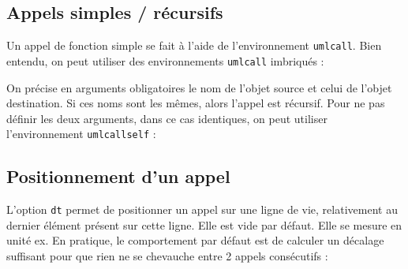 \documentclass[a4paper,11pt]{report}
\newcommand{\inputTikZ}[1]{%
  }%
\newcommand{\inputTikZ}[1]{%
    \texttt{[image: fig/\#1.pdf]}%
  }%
\begin{document}
\subsection{Appels simples / récursifs}\label{ss.call}

Un appel de fonction simple se fait à l'aide de l'environnement {\tt umlcall}. Bien entendu, on peut utiliser des environnements {\tt umlcall} imbriqués :

\medskip

\begin{minipage}{0.4\textwidth}

\end{minipage}
\begin{minipage}{0.6\textwidth}
\begin{center}
\inputTikZ{call}
\end{center}
\end{minipage}

\medskip

On précise en arguments obligatoires le nom de l'objet source et celui de l'objet destination.
Si ces noms sont les mêmes, alors l'appel est récursif. Pour ne pas définir les deux arguments, dans ce cas identiques, on peut utiliser l'environnement {\tt umlcallself} :

\medskip

\begin{minipage}{0.5\textwidth}

\end{minipage}
\begin{minipage}{0.5\textwidth}
\begin{center}
\inputTikZ{callself}
\end{center}
\end{minipage}

\subsection{Positionnement d'un appel}\label{ss.calldt}

L'option {\tt dt} permet de positionner un appel sur une ligne de vie, relativement au dernier élément présent sur cette ligne. Elle est vide par défaut. Elle se mesure en unité ex. En pratique, le comportement par défaut est de calculer un décalage suffisant pour que rien ne se chevauche entre 2 appels consécutifs :

\medskip

\begin{minipage}{0.5\textwidth}

\end{minipage}
\begin{minipage}{0.5\textwidth}
\begin{center}
\inputTikZ{calldt}
\end{center}
\end{minipage}
\end{document}
